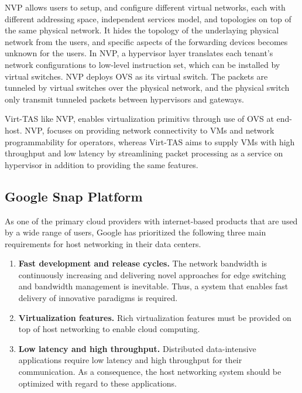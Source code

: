 NVP allows users to setup, and configure different virtual networks, each with
different addressing space, independent services model, and topologies
on top of the same physical network. It hides the topology of  the underlaying physical network
from the users, and specific aspects of the forwarding devices becomes unknown for the users. 
In NVP, a hypervisor layer translates each tenant's network configurations to 
low-level instruction set, which can be installed by virtual switches. NVP deploys OVS
as its virtual switch. The packets are tunneled by virtual switches over the physical network, and 
the physical switch only transmit tunneled packets between hypervisors and gateways.

Virt-TAS like NVP, enables virtualization primitivs through use of OVS at end-host. 
NVP, focuses on providing network connectivity to VMs and network programmability 
for operators, whereas Virt-TAS aims to supply VMs with high throughput and low latency 
by streamlining packet processing as a service on hypervisor in addition to providing 
the same features.


\subsection{Google Snap Platform}
\label{snap}

As one of the primary cloud providers with internet-based products that are used by a wide 
range of users, Google has prioritized the following three main requirements for host 
networking in their data centers. 

\begin{enumerate}
    \item \textbf{Fast development and release cycles.} The network bandwidth is continuously 
    increasing and delivering novel approaches for edge switching and bandwidth management is 
    inevitable. Thus, a system that enables fast delivery of innovative paradigms is required.

    \item \textbf{Virtualization features.} Rich virtualization features must be provided on 
    top of host networking to enable cloud computing.

    \item \textbf{Low latency and high throughput.} Distributed data-intensive applications 
    require low latency and high throughput for their communication. As a consequence, the 
    host networking system should be optimized with regard to these applications.

\end{enumerate}

